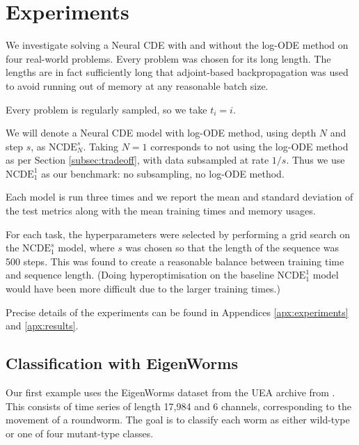 \section{Experiments} \label{sec:experiments}
We investigate solving a Neural CDE with and without the log-ODE method on four real-world problems. Every problem was chosen for its long length. The lengths are in fact sufficiently long that adjoint-based backpropagation was used to avoid running out of memory at any reasonable batch size.

Every problem is regularly sampled, so we take $t_i = i$.

We will denote a Neural CDE model with log-ODE method, using depth $N$ and step $s$, as $\mathrm{NCDE}^s_N$. Taking $N=1$ corresponds to not using the log-ODE method as per Section \ref{subsec:tradeoff}, with data subsampled at rate $1/s$. Thus we use $\mathrm{NCDE}^1_1$ as our benchmark: no subsampling, no log-ODE method.

Each model is run three times and we report the mean and standard deviation of the test metrics along with the mean training times and memory usages. 

For each task, the hyperparameters were selected by performing a grid search on the $\mathrm{NCDE}^s_1$ model, where $s$ was chosen so that the length of the sequence was 500 steps. This was found to create a reasonable balance between training time and sequence length. (Doing hyperoptimisation on the baseline $\mathrm{NCDE}_1^1$ model would have been more difficult due to the larger training times.) 


Precise details of the experiments can be found in Appendices \ref{apx:experiments} and \ref{apx:results}.

\subsection{Classification with EigenWorms}
Our first example uses the EigenWorms dataset from the UEA archive from \cite{bagnall16bakeoff}. This consists of time series of length 17,984 and 6 channels, corresponding to the movement of a roundworm. The goal is to classify each worm as either wild-type or one of four mutant-type classes.

